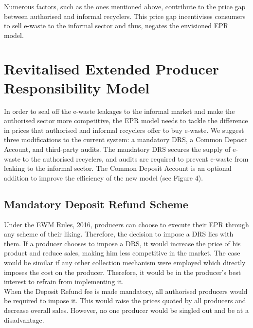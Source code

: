 \documentclass[a4paper, 12pt]{article}
\begin{document}
                    Numerous factors, such as the ones mentioned above, contribute to the price gap between authorised and informal recyclers. This price gap incentivises consumers to sell e-waste to the informal sector and thus, negates the envisioned EPR model.\\
                    
                    
                    \section{Revitalised Extended Producer Responsibility Model}
                    
                    In order to seal off the e-waste leakages to the informal market and make the authorised sector more competitive, the EPR model needs to tackle the difference in prices that authorised and informal recyclers offer to buy e-waste. We suggest three modifications to the current system: a mandatory DRS, a Common Deposit Account, and third-party audits. The mandatory DRS secures the supply of e-waste to the authorised recyclers, and audits are required to prevent e-waste from leaking to the informal sector. The Common Deposit Account is an optional addition to improve the efficiency of the new model (see Figure 4). \\
                    
                    \subsection{Mandatory Deposit Refund Scheme}
                    
                    Under the EWM Rules, 2016, producers can choose to execute their EPR through any scheme of their liking. Therefore, the decision to impose a DRS lies with them. If a producer chooses to impose a DRS, it would increase the price of his product and reduce sales, making him less competitive in the market. The case would be similar if any other collection mechanism were employed which directly imposes the cost on the producer. Therefore, it would be in the producer’s best interest to refrain from implementing it. \\
                    
                    When the Deposit Refund fee is made mandatory, all authorised producers would be required to impose it. This would raise the prices quoted by all producers and decrease overall sales. However, no one producer would be singled out and be at a disadvantage.\\
                      
\end{document}
